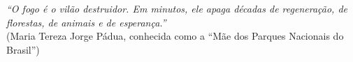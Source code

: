 
\begin{epigrafe}
\vspace*{\fill}
\begin{flushright}
\textit{“O fogo é o vilão destruidor. Em minutos, ele apaga décadas de regeneração, de florestas, de animais e de esperança.”}\\
(Maria Tereza Jorge Pádua, conhecida como a “Mãe dos Parques Nacionais do Brasil”)
\end{flushright}
\vspace*{\fill}
\end{epigrafe}
